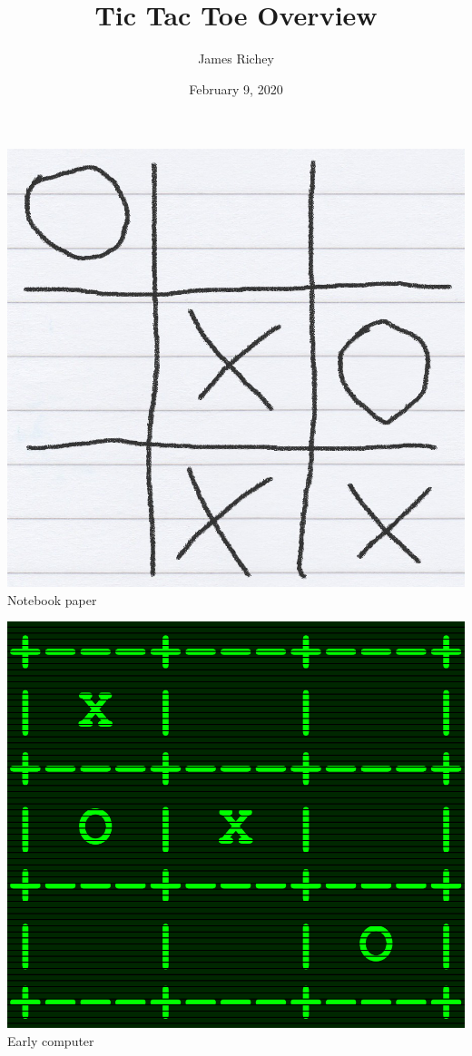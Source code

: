 \documentclass{tufte-handout}
\title{Tic Tac Toe Overview}
\author{James Richey}
\date{February 9, 2020}
\begin{document}
\maketitle


\begin{marginfigure}
  \includegraphics[width=\linewidth]{img/concept-art/paper}
  Notebook paper
\end{marginfigure}

\begin{marginfigure}
  \includegraphics[width=\linewidth]{img/concept-art/computer}
  Early computer
\end{marginfigure}
\end{document}
